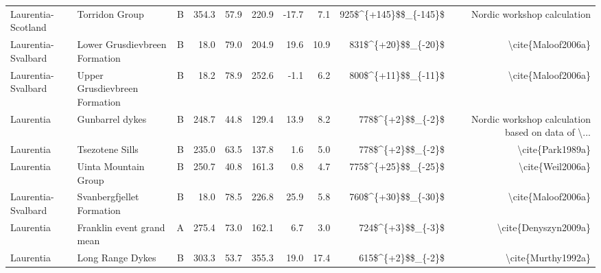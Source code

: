 \begin{longtable}{p{1 in}p{1 in}rrrrrrrr}
            Laurentia-Scotland &                                   Torridon Group &      B &     354.3 &      57.9 & 220.9 & -17.7 &       7.1 &  925\$\textasciicircum \{+145\}\$\$\_\{-145\}\$ &                        Nordic workshop calculation \\
            Laurentia-Svalbard &                    Lower Grusdievbreen Formation &      B &      18.0 &      79.0 & 204.9 &  19.6 &      10.9 &    831\$\textasciicircum \{+20\}\$\$\_\{-20\}\$ &                                 \textbackslash cite\{Maloof2006a\} \\
            Laurentia-Svalbard &                    Upper Grusdievbreen Formation &      B &      18.2 &      78.9 & 252.6 &  -1.1 &       6.2 &    800\$\textasciicircum \{+11\}\$\$\_\{-11\}\$ &                                 \textbackslash cite\{Maloof2006a\} \\
                     Laurentia &                                  Gunbarrel dykes &      B &     248.7 &      44.8 & 129.4 &  13.9 &       8.2 &      778\$\textasciicircum \{+2\}\$\$\_\{-2\}\$ &  Nordic workshop calculation based on data of \textbackslash ... \\
                     Laurentia &                                  Tsezotene Sills &      B &     235.0 &      63.5 & 137.8 &   1.6 &       5.0 &      778\$\textasciicircum \{+2\}\$\$\_\{-2\}\$ &                                   \textbackslash cite\{Park1989a\} \\
                     Laurentia &                             Uinta Mountain Group &      B &     250.7 &      40.8 & 161.3 &   0.8 &       4.7 &    775\$\textasciicircum \{+25\}\$\$\_\{-25\}\$ &                                   \textbackslash cite\{Weil2006a\} \\
            Laurentia-Svalbard &                        Svanbergfjellet Formation &      B &      18.0 &      78.5 & 226.8 &  25.9 &       5.8 &    760\$\textasciicircum \{+30\}\$\$\_\{-30\}\$ &                                 \textbackslash cite\{Maloof2006a\} \\
                     Laurentia &                        Franklin event grand mean &      A &     275.4 &      73.0 & 162.1 &   6.7 &       3.0 &      724\$\textasciicircum \{+3\}\$\$\_\{-3\}\$ &                               \textbackslash cite\{Denyszyn2009a\} \\
                     Laurentia &                                 Long Range Dykes &      B &     303.3 &      53.7 & 355.3 &  19.0 &      17.4 &      615\$\textasciicircum \{+2\}\$\$\_\{-2\}\$ &                                 \textbackslash cite\{Murthy1992a\} \\

\end{longtable}
